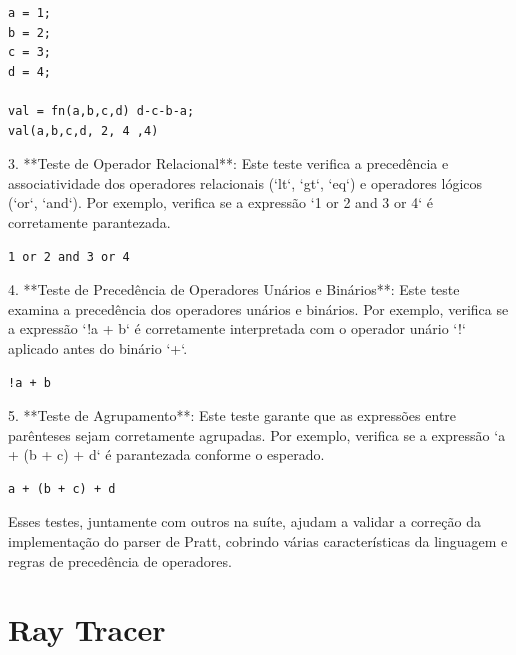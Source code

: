 \documentclass[english, 
               brazil, 
               bsc] %
               {dcomp-abntex2}
\begin{document}
\begin{verbatim}
a = 1;
b = 2;
c = 3;
d = 4;

val = fn(a,b,c,d) d-c-b-a; 
val(a,b,c,d, 2, 4 ,4)
\end{verbatim}

3. **Teste de Operador Relacional**: Este teste verifica a precedência e associatividade dos operadores relacionais (`lt`, `gt`, `eq`) e operadores lógicos (`or`, `and`). Por exemplo, verifica se a expressão `1 or 2 and 3 or 4` é corretamente parantezada.

\begin{verbatim}
1 or 2 and 3 or 4
\end{verbatim}

4. **Teste de Precedência de Operadores Unários e Binários**: Este teste examina a precedência dos operadores unários e binários. Por exemplo, verifica se a expressão `!a + b` é corretamente interpretada com o operador unário `!` aplicado antes do binário `+`.

\begin{verbatim}
!a + b
\end{verbatim}

5. **Teste de Agrupamento**: Este teste garante que as expressões entre parênteses sejam corretamente agrupadas. Por exemplo, verifica se a expressão `a + (b + c) + d` é parantezada conforme o esperado.

\begin{verbatim}
a + (b + c) + d
\end{verbatim}

Esses testes, juntamente com outros na suíte, ajudam a validar a correção da implementação do parser de Pratt, cobrindo várias características da linguagem e regras de precedência de operadores.

\section{Ray Tracer}


% 

% 
% 
% 
% 




\postextual

\renewcommand{\chapnumfont}{\chaptitlefont}
\renewcommand{\afterchapternum}{}
% 
% 
\end{document}
